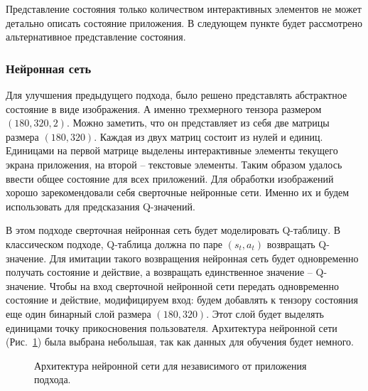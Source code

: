 Представление состояния только количеством интерактивных элементов не может детально описать состояние приложения. В следующем пункте будет рассмотрено альтернативное представление состояния.

\subsubsection{Нейронная сеть}

Для улучшения предыдущего подхода, было решено представлять абстрактное состояние в виде изображения. А именно трехмерного тензора размером $(180, 320, 2)$. Можно заметить, что он представляет из себя две матрицы размера $(180, 320)$. Каждая из двух матриц состоит из нулей и единиц. Единицами на первой матрице выделены интерактивные элементы текущего экрана приложения, на второй -- текстовые элементы. Таким образом удалось ввести общее состояние для всех приложений. Для обработки изображений хорошо зарекомендовали себя сверточные нейронные сети. Именно их и будем использовать для предсказания Q-значений.

В этом подходе сверточная нейронная сеть будет моделировать Q-таблицу. В классическом подходе, Q-таблица должна по паре $(s_t, a_t)$ возвращать Q-значение. Для имитации такого возвращения нейронная сеть будет одновременно получать состояние и действие, а возвращать единственное значение -- Q-значение. Чтобы на вход сверточной нейронной сети передать одновременно состояние и действие, модифицируем вход: будем добавлять к тензору состояния еще один бинарный слой размера $(180, 320)$. Этот слой будет выделять единицами точку прикосновения пользователя. Архитектура нейронной сети (Рис.~\ref{neural_network}) была выбрана небольшая, так как данных для обучения будет немного. 

\begin{figure}[h]
\caption{Архитектура нейронной сети для независимого от приложения подхода.}
\label{neural_network}
\end{figure}

